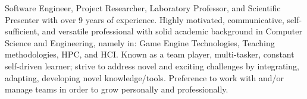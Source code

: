 

\begin{cvsummary}

Software Engineer, Project Researcher, Laboratory Professor, and Scientific Presenter with over 9 years of experience.
Highly motivated, communicative, self-sufficient, and versatile professional with solid academic background in Computer Science and Engineering, namely in: 
Game Engine Technologies, Teaching methodologies, HPC, and HCI.
Known as a team player, multi-tasker, constant self-driven learner; strive to address novel and exciting challenges by integrating, adapting, developing novel knowledge/tools.
Preference to work with and/or manage teams in order to grow personally and professionally.
\end{cvsummary}
